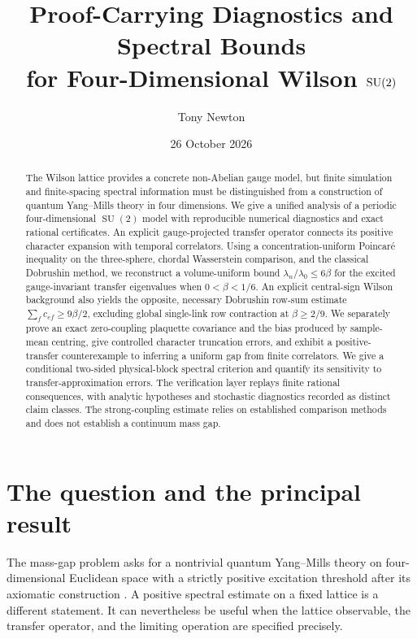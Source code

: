 \documentclass[11pt,a4paper]{article}
\title{\vspace{-0.8cm}\bfseries
Proof-Carrying Diagnostics and Spectral Bounds\\
for Four-Dimensional Wilson \(\SU\)}
\author{Tony Newton}
\date{26 October 2026}
\numberwithin{equation}{section}
\newcommand{\SU}{\operatorname{SU}(2)}
\begin{document}
\maketitle
\begin{abstract}
The Wilson lattice provides a concrete non-Abelian gauge model, but finite
simulation and finite-spacing spectral information must be distinguished
from a construction of quantum Yang--Mills theory in four dimensions.
We give a unified analysis of a periodic four-dimensional \(\SU\)
model with reproducible numerical diagnostics and exact rational
certificates. An explicit gauge-projected transfer operator connects
its positive character expansion with temporal correlators. Using a
concentration-uniform Poincar\'e inequality on the three-sphere,
chordal Wasserstein comparison, and the classical Dobrushin method,
we reconstruct a volume-uniform bound
\(\lambda_n/\lambda_0\leq 6\beta\) for the excited
gauge-invariant transfer eigenvalues when \(0<\beta<1/6\).
An explicit central-sign Wilson background also yields the opposite,
necessary Dobrushin row-sum estimate \(\sum_f c_{ef}\geq9\beta/2\),
excluding global single-link row contraction at \(\beta\geq2/9\).
We separately prove an exact zero-coupling plaquette covariance and
the bias produced by sample-mean centring, give controlled character
truncation errors, and exhibit a positive-transfer counterexample
to inferring a uniform gap from finite correlators.
We give a conditional two-sided physical-block spectral criterion
and quantify its sensitivity to transfer-approximation errors.
The verification layer replays finite rational consequences, with
analytic hypotheses and stochastic diagnostics recorded as distinct
claim classes. The strong-coupling estimate relies on established
comparison methods and does not establish a continuum mass gap.
\end{abstract}

\section{The question and the principal result}

The mass-gap problem asks for a nontrivial quantum Yang--Mills theory
on four-dimensional Euclidean space with a strictly positive excitation
threshold after its axiomatic construction \cite{JaffeWitten}.
A positive spectral estimate on a fixed lattice is a different
statement. It can nevertheless be useful when the lattice observable,
the transfer operator, and the limiting operation are specified precisely.
\end{document}
